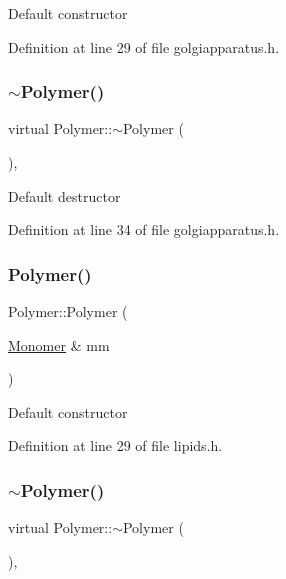 Default constructor 

Definition at line 29 of file golgiapparatus.\+h.

\mbox{\label{class_polymer_aac2b3983f375a5691c7d5ca1a79594d5}} 
\subsubsection{\texorpdfstring{$\sim$\+Polymer()}{~Polymer()}\hspace{0.1cm}{\footnotesize\ttfamily [5/11]}}
{\footnotesize\ttfamily virtual Polymer\+::$\sim$\+Polymer (\begin{DoxyParamCaption}{ }\end{DoxyParamCaption})\hspace{0.3cm}{\ttfamily [inline]}, {\ttfamily [virtual]}}

Default destructor 

Definition at line 34 of file golgiapparatus.\+h.

\mbox{\label{class_polymer_ae77454a3908652e4df6a26b9cac509a5}} 
\subsubsection{\texorpdfstring{Polymer()}{Polymer()}\hspace{0.1cm}{\footnotesize\ttfamily [6/14]}}
{\footnotesize\ttfamily Polymer\+::\+Polymer (\begin{DoxyParamCaption}\item[{\hyperlink{class_monomer}{Monomer} \&}]{mm }\end{DoxyParamCaption})\hspace{0.3cm}{\ttfamily [inline]}}

Default constructor 

Definition at line 29 of file lipids.\+h.

\mbox{\label{class_polymer_aac2b3983f375a5691c7d5ca1a79594d5}} 
\subsubsection{\texorpdfstring{$\sim$\+Polymer()}{~Polymer()}\hspace{0.1cm}{\footnotesize\ttfamily [6/11]}}
{\footnotesize\ttfamily virtual Polymer\+::$\sim$\+Polymer (\begin{DoxyParamCaption}{ }\end{DoxyParamCaption})\hspace{0.3cm}{\ttfamily [inline]}, {\ttfamily [virtual]}}

